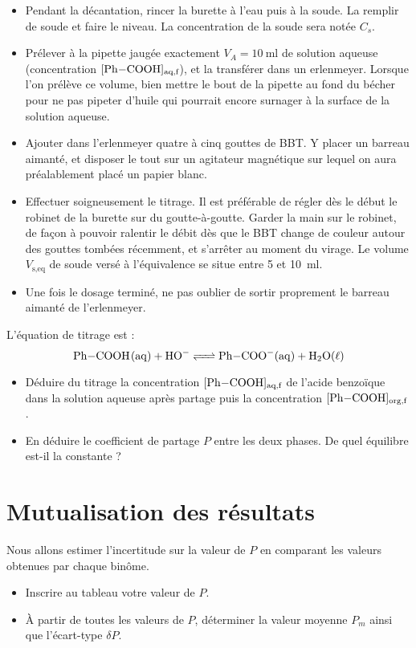 \documentclass{tp}
\begin{document}
\begin{itemize}
  \item Pendant la décantation, rincer la burette à l'eau puis à la soude. La remplir de soude et faire le niveau. La concentration de la soude sera notée $C_s$.

  \item Prélever à la pipette jaugée exactement $V_A = \SI{10}{\milli\litre}$ de solution aqueuse (concentration $[\ce{Ph-COOH}]_\text{aq,f}$), et la transférer dans un erlenmeyer. Lorsque l'on prélève ce volume, bien mettre le bout de la pipette au fond du bécher pour ne pas pipeter d'huile qui pourrait encore surnager à la surface de la solution aqueuse.

  \item Ajouter dans l'erlenmeyer quatre à cinq gouttes de BBT. Y placer un barreau aimanté, et disposer le tout sur un agitateur magnétique sur lequel on aura préalablement placé un papier blanc.

  \item Effectuer soigneusement le titrage. Il est préférable de régler dès le début le robinet de la burette sur du goutte-à-goutte. Garder la main sur le robinet, de façon à pouvoir ralentir le débit dès que le BBT change de couleur autour des gouttes tombées récemment, et s'arrêter au moment du virage. Le volume $V_\text{s,eq}$ de soude versé à l'équivalence se situe entre 5 et \SI{10}{\milli\litre}.

  \item Une fois le dosage terminé, ne pas oublier de sortir proprement le barreau aimanté de l'erlenmeyer.
\end{itemize}

L'équation de titrage est :
\[
\ce{Ph-COOH(aq) + HO- <=> Ph-COO-(aq) + H2O($\ell$)}
\]


\begin{itemize}
  \item Déduire du titrage la concentration $[\ce{Ph-COOH}]_\text{aq,f}$ de l'acide benzoïque dans la solution aqueuse après partage puis la concentration $[\ce{Ph-COOH}]_\text{org,f}$.

  \item En déduire le coefficient de partage $P$ entre les deux phases. De quel équilibre est-il la constante ? 
\end{itemize}

\section{Mutualisation des résultats}%
\label{sec:mutualisation_des_resultats}
Nous allons estimer l'incertitude sur la valeur de $P$ en comparant les valeurs obtenues par chaque binôme.

\begin{itemize}
  \item Inscrire au tableau votre valeur de $P$.
  \item À partir de toutes les valeurs de $P$, déterminer la valeur moyenne $P_m$ ainsi que l'écart-type $\delta P$.  
\end{itemize}
\end{document}
